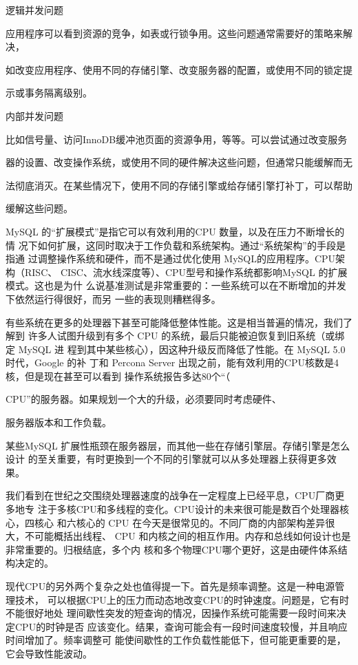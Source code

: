 逻辑并发问题

应用程序可以看到资源的竞争，如表或行锁争用。这些问题通常需要好的策略来解决，

如改变应用程序、使用不同的存储引擎、改变服务器的配置，或使用不同的锁定提

示或事务隔离级别。

内部并发问题

比如信号量、访问InnoDB缓冲池页面的资源争用，等等。可以尝试通过改变服务

器的设置、改变操作系统，或使用不同的硬件解决这些问题，但通常只能缓解而无

法彻底消灭。在某些情况下，使用不同的存储引擎或给存储引擎打补丁，可以帮助

缓解这些问题。

MySQL 的“扩展模式”是指它可以有效利用的CPU 数量，以及在压力不断增长的情
况下如何扩展，这同时取决于工作负载和系统架构。通过“系统架构”的手段是指通
过调整操作系统和硬件，而不是通过优化使用 MySQL的应用程序。CPU架构（RISC、
CISC、流水线深度等）、CPU型号和操作系统都影响MySQL 的扩展模式。这也是为什
么说基准测试是非常重要的：一些系统可以在不断增加的并发下依然运行得很好，而另
一些的表现则糟糕得多。

有些系统在更多的处理器下甚至可能降低整体性能。这是相当普遍的情况，我们了解到
许多人试图升级到有多个 CPU 的系统，最后只能被迫恢复到旧系统（或绑定 MySQL 进
程到其中某些核心），因这种升级反而降低了性能。在 MySQL 5.0时代，Google 的补
丁和 Percona Server 出现之前，能有效利用的CPU核数是4核，但是现在甚至可以看到
操作系统报告多达80个“（

CPU”的服务器。如果规划一个大的升级，必须要同时考虑硬件、

服务器版本和工作负载。

某些MySQL 扩展性瓶颈在服务器层，而其他一些在存储引擎层。存储引擎是怎么设计
的至关重要，有时更換到一个不同的引擎就可以从多处理器上获得更多效果。

我们看到在世纪之交围绕处理器速度的战争在一定程度上已经平息，CPU厂商更多地专
注于多核CPU和多线程的变化。CPU设计的未来很可能是数百个处理器核心，四核心
和六核心的 CPU 在今天是很常见的。不同厂商的内部架构差异很大，不可能概括出线程、
CPU 和内核之间的相互作用。内存和总线如何设计也是非常重要的。归根结底，多个内
核和多个物理CPU哪个更好，这是由硬件体系结构决定的。

现代CPU的另外两个复杂之处也值得提一下。首先是频率调整。这是一种电源管理技术，
可以根据CPU上的压力而动态地改变CPU的时钟速度。问题是，它有时不能很好地处
理间歇性突发的短查询的情况，因操作系统可能需要一段时间来决定CPU的时钟是否
应该变化。结果，查询可能会有一段时间速度较慢，并且响应时间增加了。频率调整可
能使间歇性的工作负载性能低下，但可能更重要的是，它会导致性能波动。


